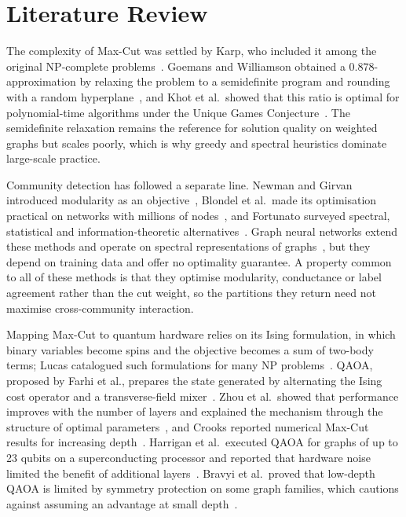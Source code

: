 \documentclass[pdflatex,sn-mathphys-num]{sn-jnl}
\theoremstyle{thmstyleone}
\theoremstyle{thmstyletwo}
\theoremstyle{thmstylethree}
\begin{document}
\section{Literature Review}\label{sec:lit}

The complexity of Max-Cut was settled by Karp, who included it among the original NP-complete problems~\cite{karp1972reducibility}. Goemans and Williamson obtained a $0.878$-approximation by relaxing the problem to a semidefinite program and rounding with a random hyperplane~\cite{goemans1995improved}, and Khot et al.\ showed that this ratio is optimal for polynomial-time algorithms under the Unique Games Conjecture~\cite{khot2007optimal}. The semidefinite relaxation remains the reference for solution quality on weighted graphs but scales poorly, which is why greedy and spectral heuristics dominate large-scale practice.

Community detection has followed a separate line. Newman and Girvan introduced modularity as an objective~\cite{newman2004finding}, Blondel et al.\ made its optimisation practical on networks with millions of nodes~\cite{blondel2008fast}, and Fortunato surveyed spectral, statistical and information-theoretic alternatives~\cite{fortunato2010community}. Graph neural networks extend these methods and operate on spectral representations of graphs~\cite{bruna2013spectral}, but they depend on training data and offer no optimality guarantee. A property common to all of these methods is that they optimise modularity, conductance or label agreement rather than the cut weight, so the partitions they return need not maximise cross-community interaction.

Mapping Max-Cut to quantum hardware relies on its Ising formulation, in which binary variables become spins and the objective becomes a sum of two-body terms; Lucas catalogued such formulations for many NP problems~\cite{lucas2014ising}. QAOA, proposed by Farhi et al., prepares the state generated by alternating the Ising cost operator and a transverse-field mixer~\cite{farhi2014quantum}. Zhou et al.\ showed that performance improves with the number of layers and explained the mechanism through the structure of optimal parameters~\cite{zhou2020quantum}, and Crooks reported numerical Max-Cut results for increasing depth~\cite{crooks2018performance}. Harrigan et al.\ executed QAOA for graphs of up to 23 qubits on a superconducting processor and reported that hardware noise limited the benefit of additional layers~\cite{harrigan2021quantum}. Bravyi et al.\ proved that low-depth QAOA is limited by symmetry protection on some graph families, which cautions against assuming an advantage at small depth~\cite{bravyi2020obstacles}.
\end{document}
